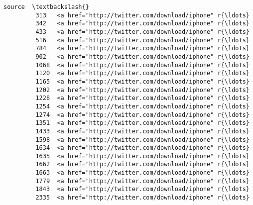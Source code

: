 \documentclass[11pt]{article}
\begin{document}
\begin{Verbatim}[commandchars=\\\{\}]
                                                          source  \textbackslash{}
         313   <a href="http://twitter.com/download/iphone" r{\ldots}   
         342   <a href="http://twitter.com/download/iphone" r{\ldots}   
         433   <a href="http://twitter.com/download/iphone" r{\ldots}   
         516   <a href="http://twitter.com/download/iphone" r{\ldots}   
         784   <a href="http://twitter.com/download/iphone" r{\ldots}   
         902   <a href="http://twitter.com/download/iphone" r{\ldots}   
         1068  <a href="http://twitter.com/download/iphone" r{\ldots}   
         1120  <a href="http://twitter.com/download/iphone" r{\ldots}   
         1165  <a href="http://twitter.com/download/iphone" r{\ldots}   
         1202  <a href="http://twitter.com/download/iphone" r{\ldots}   
         1228  <a href="http://twitter.com/download/iphone" r{\ldots}   
         1254  <a href="http://twitter.com/download/iphone" r{\ldots}   
         1274  <a href="http://twitter.com/download/iphone" r{\ldots}   
         1351  <a href="http://twitter.com/download/iphone" r{\ldots}   
         1433  <a href="http://twitter.com/download/iphone" r{\ldots}   
         1598  <a href="http://twitter.com/download/iphone" r{\ldots}   
         1634  <a href="http://twitter.com/download/iphone" r{\ldots}   
         1635  <a href="http://twitter.com/download/iphone" r{\ldots}   
         1662  <a href="http://twitter.com/download/iphone" r{\ldots}   
         1663  <a href="http://twitter.com/download/iphone" r{\ldots}   
         1779  <a href="http://twitter.com/download/iphone" r{\ldots}   
         1843  <a href="http://twitter.com/download/iphone" r{\ldots}   
         2335  <a href="http://twitter.com/download/iphone" r{\ldots}   
         

\end{Verbatim}
\end{document}
